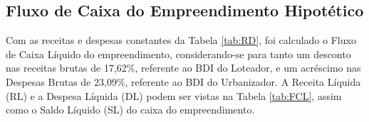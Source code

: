 \documentclass[
  10pt,
  a4paper]{article}
\begin{document}
\subsection*{Fluxo de Caixa do Empreendimento
Hipotético}\label{fluxo-de-caixa-do-empreendimento-hipotuxe9tico}

Com as receitas e despesas constantes da Tabela \ref{tab:RD}, foi
calculado o Fluxo de Caixa Líquido do empreendimento, considerando-se
para tanto um desconto nas receitas brutas de 17,62\%, referente ao BDI
do Loteador, e um acréscimo nas Despesas Brutas de 23,09\%, referente ao
BDI do Urbanizador. A Receita Líquida (RL) e a Despesa Líquida (DL)
podem ser vistas na Tabela \ref{tab:FCL}, assim como o Saldo Líquido
(SL) do caixa do empreendimento.
\end{document}
